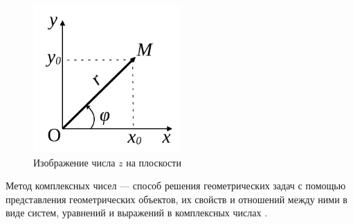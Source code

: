 \begin{figure}[ht]
   \centering
   \includegraphics[width=0.5\textwidth]{images/theory-1.pdf}
   \caption{Изображение числа \(z\) на плоскости}
   \label{theory-1}
\end{figure}
Метод комплексных чисел --- способ решения геометрических задач с помощью представления геометрических объектов, их свойств и отношений между ними в виде систем, уравнений и выражений в комплексных числах \cite[с. 7]{book:ponarin}.

